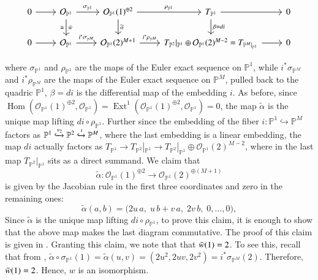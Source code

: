 \documentclass[11pt,twoside]{amsart}
\theoremstyle{plain}
\numberwithin{equation}{section}
\theoremstyle{definition}
\newcommand{\PP}{\mathbb{P}}
\newcommand{\OO}{\mathcal{O}}
\begin{document}
\color{black}

\[
\begin{tikzcd}
  0 \arrow[r] & \mathcal{O}_{\mathbb{P}^1} \arrow[r, "\sigma_{\mathbb{P}^1}"] \arrow[d, "\Bar{w}", "\cong"'] & \mathcal{O}_{\mathbb{P}^1}(1)^{\oplus 2} \arrow[r, "\rho_{\mathbb{P}^1}"] \arrow[d, "\widetilde{\alpha}"] & T_{\mathbb{P}^1} \arrow[r] \arrow[d, "\beta = di"] & 0 \\
   0 \arrow[r] & \mathcal{O}_{\mathbb{P}^1} \arrow[r, "i^*\sigma_{\mathbb{P}^M}"] & \mathcal{O}_{\mathbb{P}^1}(2)^{M+1} \arrow[r, "i^*\rho_{\mathbb{P}^M}"] & T_{\mathbb{P}^2}|_{\mathbb{P}^1} \oplus \mathcal{O}_{\mathbb{P}^1}(2)^{M-2} = T_{\mathbb{P}^M|_{\mathbb{P}^1}} \arrow[r] & 0
\end{tikzcd}
\]

where $\sigma_{\mathbb{P}^1}$ and $\rho_{\mathbb{P}^1}$ are the maps of the Euler exact sequence on $\mathbb{P}^1$, while $i^*\sigma_{\mathbb{P}^M}$ and $i^*\rho_{\mathbb{P}^M}$ are the maps of the Euler exact sequence on $\mathbb{P}^M$, pulled back to the quadric $\mathbb{P}^1$, $\beta = di$ is the differential map of the embedding $i$. 
As before, since $\operatorname{Hom}(\mathcal{O}_{\mathbb{P}^1}(1)^{\oplus 2}, \mathcal{O}_{\mathbb{P}^1}) = \operatorname{Ext}^1(\mathcal{O}_{\mathbb{P}^1}(1)^{\oplus 2}, \mathcal{O}_{\mathbb{P}^1}) = 0$, the map $\widetilde{\alpha}$ is the unique map lifting $di \circ \rho_{\mathbb{P}^1}$. Further since the embedding of the fiber $i: \mathbb{P}^1 \hookrightarrow \mathbb{P}^{M}$ factors as $\mathbb{P}^1 \xhookrightarrow{\nu_2} \mathbb{P}^2 \xhookrightarrow{\iota} \mathbb{P}^{M}$, where the last embedding is a linear embedding, the map $di$ actually factors as $T_{\mathbb{P}^1} \to T_{\mathbb{P}^2}|_{\mathbb{P}^1} \to T_{\mathbb{P}^2}|_{\mathbb{P}^1} \oplus \mathcal{O}_{\mathbb{P}^1}(2)^{M-2}$, where in the last map $T_{\mathbb{P}^2}|_{\mathbb{P}^1}$ sits as a direct summand. 
We claim that 
\[
\widetilde\alpha:\OO_{\PP^1}(1)^{\oplus 2}\longrightarrow \OO_{\PP^1}(2)^{\oplus (M+1)}
\]
is given by the Jacobian rule in the first three coordinates and zero in the remaining ones:
\[
\widetilde\alpha(a,b)=\bigl(2u\,a,\;u\,b+v\,a,\;2v\,b,\;0,\dots,0\bigr),
\]
Since $\widetilde{\alpha}$ is the unique map lifting $di \circ \rho_{\mathbb{P}^1}$, to prove this claim, it is enough to show that the above map makes the last diagram commutative. The proof of this claim is given in . Granting this claim, we note that that $\Bar{w}(1) = 2$. To see this, recall that from , $\widetilde{\alpha} \circ \sigma_{\mathbb{P}^1}(1) = \widetilde{\alpha}(u,v) = (2u^2, 2uv, 2v^2) = i^*\sigma_{\mathbb{P}^M}(2)$. Therefore, $\Bar{w}(1) = 2$. Hence, $w$ is an isomorphism.
 
\end{document}
